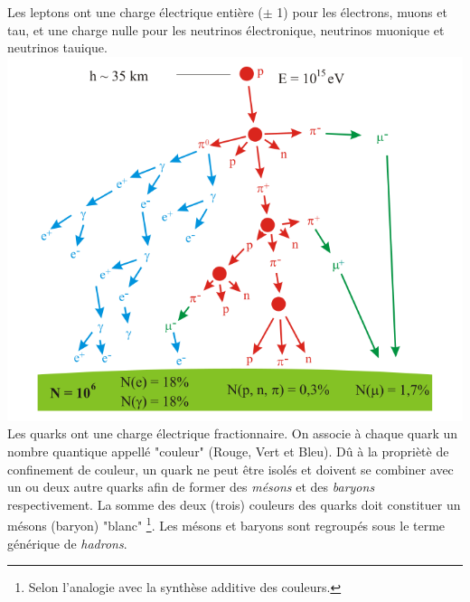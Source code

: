 Les leptons ont une charge électrique entière ($\pm$ 1) pour les électrons, muons et tau, et une charge nulle pour les neutrinos électronique, neutrinos muonique et neutrinos tauique.
\marginpar
{
\hspace*{-0.5cm}
\includegraphics[width=1.2\marginparwidth]{SM/shower.png}
    	\label{gerbe}
}
Les quarks ont une charge électrique fractionnaire. On associe à chaque quark un nombre quantique appellé "couleur" (Rouge, Vert et Bleu). Dû à la propriètè de confinement de couleur, un quark ne peut être isolés et doivent se combiner avec un ou deux autre quarks afin de former des \textit{mésons} et des \textit{baryons} respectivement. La somme des deux (trois) couleurs des quarks doit constituer un mésons (baryon) "blanc" \footnote{Selon l'analogie avec la synthèse additive des couleurs.}. Les mésons et baryons sont regroupés sous le terme générique de \textit{hadrons}.

